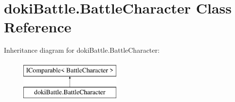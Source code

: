 \hypertarget{classdoki_battle_1_1_battle_character}{}\section{doki\+Battle.\+Battle\+Character Class Reference}
\label{classdoki_battle_1_1_battle_character}
Inheritance diagram for doki\+Battle.\+Battle\+Character\+:\begin{figure}[H]
\begin{center}
\leavevmode
\includegraphics[height=2.000000cm]{classdoki_battle_1_1_battle_character}
\end{center}
\end{figure}
